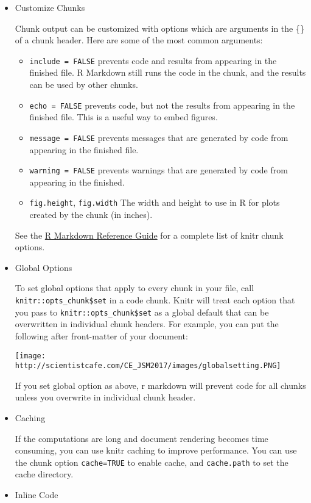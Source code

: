 \documentclass[
]{article}
\providecommand{\tightlist}{%
  \setlength{\itemsep}{0pt}\setlength{\parskip}{0pt}}
\begin{document}
\begin{itemize}
\item
  Customize Chunks

  Chunk output can be customized with options which are arguments in the
  \{\} of a chunk header. Here are some of the most common arguments:

  \begin{itemize}
  \tightlist
  \item
    \texttt{include\ =\ FALSE} prevents code and results from appearing
    in the finished file. R Markdown still runs the code in the chunk,
    and the results can be used by other chunks.
  \item
    \texttt{echo\ =\ FALSE} prevents code, but not the results from
    appearing in the finished file. This is a useful way to embed
    figures.
  \item
    \texttt{message\ =\ FALSE} prevents messages that are generated by
    code from appearing in the finished file.
  \item
    \texttt{warning\ =\ FALSE} prevents warnings that are generated by
    code from appearing in the finished.
  \item
    \texttt{fig.height}, \texttt{fig.width} The width and height to use
    in R for plots created by the chunk (in inches).
  \end{itemize}

  See the
  \href{https://www.rstudio.com/wp-content/uploads/2015/03/rmarkdown-reference.pdf}{R
  Markdown Reference Guide} for a complete list of knitr chunk options.
\item
  Global Options

  To set global options that apply to every chunk in your file, call
  \texttt{knitr::opts\_chunk\$set} in a code chunk. Knitr will treat
  each option that you pass to \texttt{knitr::opts\_chunk\$set} as a
  global default that can be overwritten in individual chunk headers.
  For example, you can put the following after front-matter of your
  document:

  \texttt{[image: http://scientistcafe.com/CE\_JSM2017/images/globalsetting.PNG]}

  If you set global option as above, r markdown will prevent code for
  all chunks unless you overwrite in individual chunk header.
\item
  Caching

  If the computations are long and document rendering becomes time
  consuming, you can use knitr caching to improve performance. You can
  use the chunk option \texttt{cache=TRUE} to enable cache, and
  \texttt{cache.path} to set the cache directory.
\item
  Inline Code


\end{itemize}
\end{document}
